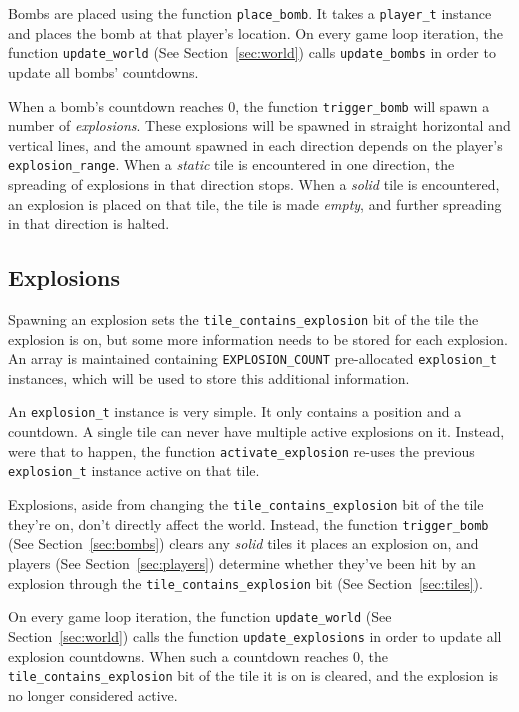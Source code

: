 Bombs are placed using the function \texttt{place\_bomb}. It takes a
\texttt{player\_t} instance and places the bomb at that player's location. On
every game loop iteration, the function \texttt{update\_world} (See
Section~\ref{sec:world}) calls \texttt{update\_bombs} in order to update all
bombs' countdowns.

When a bomb's countdown reaches 0, the function \texttt{trigger\_bomb} will
spawn a number of \emph{explosions}. These explosions will be spawned in
straight horizontal and vertical lines, and the amount spawned in each
direction depends on the player's \texttt{explosion\_range}. When a
\emph{static} tile is encountered in one direction, the spreading of explosions
in that direction stops. When a \emph{solid} tile is encountered, an explosion
is placed on that tile, the tile is made \emph{empty}, and further spreading in
that direction is halted.

\subsection{Explosions}
\label{sec:explosions}

Spawning an explosion sets the \texttt{tile\_contains\_explosion} bit of the
tile the explosion is on, but some more information needs to be stored for each
explosion. An array is maintained containing \texttt{EXPLOSION\_COUNT}
pre-allocated \texttt{explosion\_t} instances, which will be used to store this
additional information.

An \texttt{explosion\_t} instance is very simple. It only contains a position
and a countdown. A single tile can never have multiple active explosions on it.
Instead, were that to happen, the function \texttt{activate\_explosion} re-uses
the previous \texttt{explosion\_t} instance active on that tile.

Explosions, aside from changing the \texttt{tile\_contains\_explosion} bit of
the tile they're on, don't directly affect the world. Instead, the function
\texttt{trigger\_bomb} (See Section~\ref{sec:bombs}) clears any \emph{solid}
tiles it places an explosion on, and players (See Section~\ref{sec:players})
determine whether they've been hit by an explosion through the
\texttt{tile\_contains\_explosion} bit (See Section~\ref{sec:tiles}).

On every game loop iteration, the function \texttt{update\_world} (See
Section~\ref{sec:world}) calls the function \texttt{update\_explosions} in
order to update all explosion countdowns. When such a countdown reaches 0, the
\texttt{tile\_contains\_explosion} bit of the tile it is on is cleared, and the
explosion is no longer considered active.

